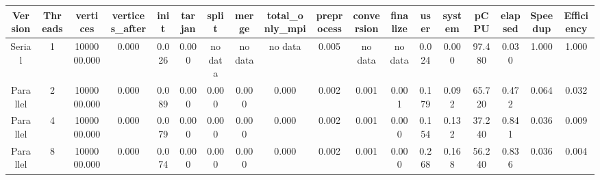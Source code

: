 \begin{tabular}{|c|c|c|c|c|c|c|c|c|c|c|c|c|c|c|c|c|c|}
\toprule
 Version &  Threads &    vertices &  vertices\_after &  init &  tarjan &   split &   merge & total\_only\_mpi &  preprocess & conversion & finalize &  user &  system &   pCPU &  elapsed &  Speedup &  Efficiency \\
\midrule
  Serial &        1 & 1000000.000 &           0.000 & 0.026 &   0.000 & no data & no data &        no data &       0.005 &    no data &  no data & 0.024 &   0.000 & 97.480 &    0.030 &    1.000 &       1.000 \\
Parallel &        2 & 1000000.000 &           0.000 & 0.089 &   0.000 &   0.000 &   0.000 &          0.000 &       0.002 &      0.001 &    0.001 & 0.179 &   0.092 & 65.720 &    0.472 &    0.064 &       0.032 \\
Parallel &        4 & 1000000.000 &           0.000 & 0.079 &   0.000 &   0.000 &   0.000 &          0.000 &       0.002 &      0.001 &    0.000 & 0.154 &   0.132 & 37.240 &    0.841 &    0.036 &       0.009 \\
Parallel &        8 & 1000000.000 &           0.000 & 0.074 &   0.000 &   0.000 &   0.000 &          0.000 &       0.002 &      0.001 &    0.000 & 0.268 &   0.168 & 56.240 &    0.836 &    0.036 &       0.004 \\
\bottomrule
\end{tabular}
